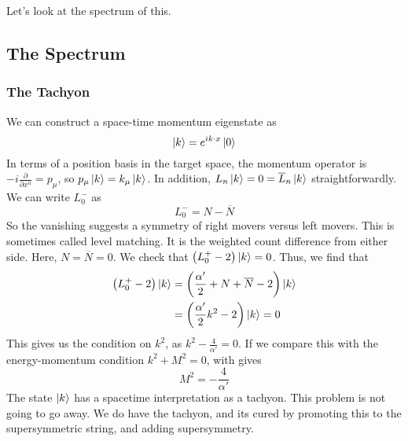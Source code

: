 \documentclass[11pt, oneside]{article}   	%
\theoremstyle{slanted}
\begin{document}
Let's look at the spectrum of this. 

\subsection{The Spectrum}

\subsubsection{The Tachyon}
We can construct a space-time momentum 
eigenstate as 
\[
\ket{ k }  = e ^{  i k \cdot  x } \ket{0} 
\] 
In terms of a position basis in 
the target space, the 
momentum operator is $  -i \frac{\partial   }{\partial  x ^ u }  
 = p _ \mu $, so 
 $ p _ \mu \ket{ k }  = k _ \mu \ket{ k } $. 
 In addition, $ L _ n \ket{ k }  = 0  = \overline{ L } _ n \ket{ k } $
 straightforwardly. 
 We can write $ L_0 ^ -  $ as 
 \[
 L_0 ^  -  = N - \overline{ N } 
 \] So the vanishing 
 suggests a symmetry of 
 right movers versus left movers. 
 This is sometimes called level matching. 
 It is the weighted count difference from 
 either side. 
 Here,  $ N  = \overline{ N }  = 0  $. 
 We check that $ \left( L _ 0 ^ +   -2  \right)  \ket{ k } =0   $. 
 Thus, we find that 
 \begin{align*}
	 \left( L_0 ^ +  - 2  \right)  \ket{ k} &=  
	 \left( \frac{\alpha  ' }{ 2 } + N + \overline{ N }  - 2  \right)  \ket{ k } \\
						&=  \left( 
						\frac{\alpha ' }{  2 }
					k ^ 2 - 2  \right)  \ket{ k } = 0  \\
 \end{align*} 
 This gives 
		us the condition on $ k ^ 2  $, as $ k ^ 2   - \frac{4}{\alpha ' }  = 0 $. 
		If we compare this with the energy-momentum condition 
		$ k ^ 2 + M ^ 2   =0  $, 
		with gives 
		\[
		 M ^ 2  =  - \frac{4}{\alpha ' } 
		\]
The state $ \ket{ k } $ has a spacetime interpretation as a tachyon. 
This problem is 
not going to go away. 
We do have the tachyon, and its 
cured by promoting this to the supersymmetric 
string, and adding supersymmetry. 
\end{document}
